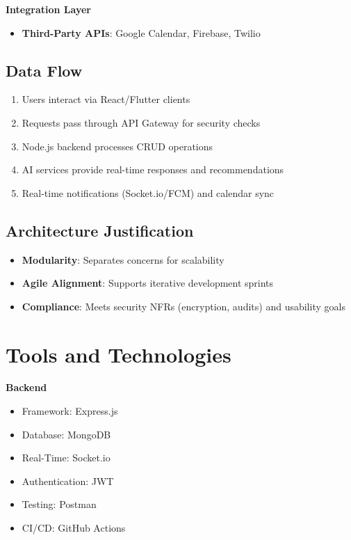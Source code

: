 \textbf{Integration Layer}
\begin{itemize}
    \item \textbf{Third-Party APIs}: Google Calendar, Firebase, Twilio
\end{itemize}

\subsection{Data Flow}
\begin{enumerate}
    \item Users interact via React/Flutter clients
    \item Requests pass through API Gateway for security checks
    \item Node.js backend processes CRUD operations
    \item AI services provide real-time responses and recommendations
    \item Real-time notifications (Socket.io/FCM) and calendar sync
\end{enumerate}

\subsection{Architecture Justification}
\begin{itemize}
    \item \textbf{Modularity}: Separates concerns for scalability
    \item \textbf{Agile Alignment}: Supports iterative development sprints
    \item \textbf{Compliance}: Meets security NFRs (encryption, audits) and usability goals
\end{itemize}

\section{Tools and Technologies}
\label{sec:tools_tech}

\textbf{Backend}
\begin{itemize}
    \item Framework: Express.js
    \item Database: MongoDB
    \item Real-Time: Socket.io
    \item Authentication: JWT
    \item Testing: Postman
    \item CI/CD: GitHub Actions
\end{itemize}

